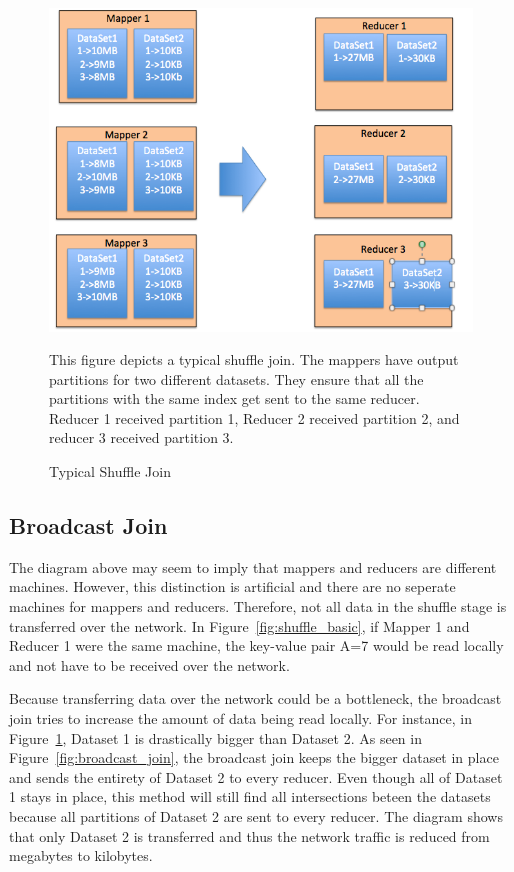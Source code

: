\begin{figure}[h]
\begin{center}
\includegraphics[scale=0.6]{./img/shuffle_join.png}
\caption{Typical Shuffle Join}
\label{fig:shuffle_join}
\end{center}
This figure depicts a typical shuffle join. The mappers have output partitions for two different datasets.
They ensure that all the partitions with the same index get sent to the same reducer. Reducer 1 received partition 1,
Reducer 2 received partition 2, and reducer 3 received partition 3.
\end{figure}

\subsection {Broadcast Join}
The diagram above  may seem to imply that mappers and reducers
are different machines. However, this distinction is artificial and there are no seperate machines for mappers and reducers. 
Therefore, not all data in the shuffle stage is transferred over the network. In Figure~\ref{fig:shuffle_basic}, if Mapper 1
and Reducer 1 were the same machine, the key-value pair A=7 would be read locally and not have to be received over the network.

Because transferring data over the network could be a bottleneck, the broadcast join tries to increase the amount of data 
being read locally. For instance, in Figure~\ref{fig:shuffle_join}, Dataset 1 is drastically bigger than Dataset 2. As seen in Figure~\ref{fig:broadcast_join},
the broadcast join keeps the bigger dataset in place and sends the entirety of Dataset 2 to every reducer. Even though all of Dataset 1 stays in place, this method will still find all intersections beteen the datasets  because all partitions of Dataset 2 are sent to every reducer. The diagram shows that only Dataset 2 is transferred and thus the  network traffic is reduced from megabytes to kilobytes.


